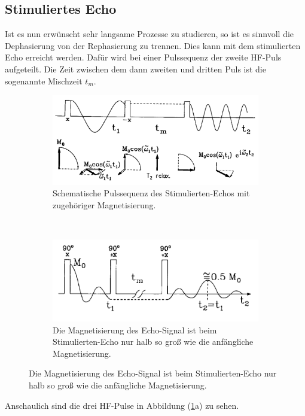 \subsection{Stimuliertes Echo}
Ist es nun erw\"{u}nscht sehr langsame Prozesse zu studieren, so ist es sinnvoll die Dephasie{\-}rung von der Rephasierung zu trennen.
Dies kann mit dem stimulierten Echo erreicht werden.
Daf\"{u}r wird bei einer Pulssequenz der zweite HF-Puls aufgeteilt.
Die Zeit zwischen dem dann zweiten und dritten Puls ist die sogenannte Mischzeit $t_m$.
\begin{figure}
\centering
\caption{Stimuliertes-Echo.}
\vspace{+5pt}
	\begin{subfigure}[t]{0.4\textwidth}
		\includegraphics[width=\textwidth]{Plots/stimuliertesecho.png} 
		\caption{Schematische Pulssequenz des Stimulierten-Echos mit zugeh\"{o}riger Magnetisierung.}
	\end{subfigure}
	~
	\begin{subfigure}[t]{0.4\textwidth}
		\includegraphics[width=\textwidth]{Plots/stimuliertesecho2.png}
		\caption{Die Magnetisierung des Echo-Signal ist beim Stimulierten-Echo nur halb so gro{\ss} wie die anf\"{a}ngliche Magnetisierung.}
	\end{subfigure}
\label{stimEcho.}
\end{figure}
Anschaulich sind die drei HF-Pulse in Abbildung (\ref{stimEcho.}a) zu sehen.

